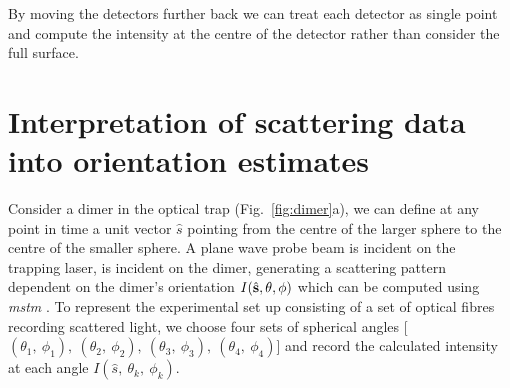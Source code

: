 By moving the detectors further back we can treat each detector as single
point and compute the intensity at the centre of the detector rather than
consider the full surface.

\section{Interpretation of scattering data into orientation estimates}
Consider a dimer in the optical trap (Fig.~\ref{fig:dimer}a), we can define at any 
point in time a unit vector $\hat{s}$ pointing from the centre of the larger sphere 
to the centre of the smaller sphere. A plane wave probe beam is incident on 
the trapping laser, is incident on the dimer, generating a scattering pattern
dependent on the dimer's orientation $I(\hat{\bf s}, \theta, \phi)$ which can be 
computed using \textit{mstm} \cite{I.Mishchenko1996}. To represent the experimental 
set up consisting of a set of optical fibres recording scattered light, we choose 
four sets of spherical angles [$(\theta_1,\ \phi_1), \ (\theta_2,\ \phi_2), \ 
(\theta_3, \ \phi_3), \ (\theta_4,\ \phi_4)$] and record the calculated intensity 
at each angle $I(\hat{s},\ \theta_k,\ \phi_k)$. 

